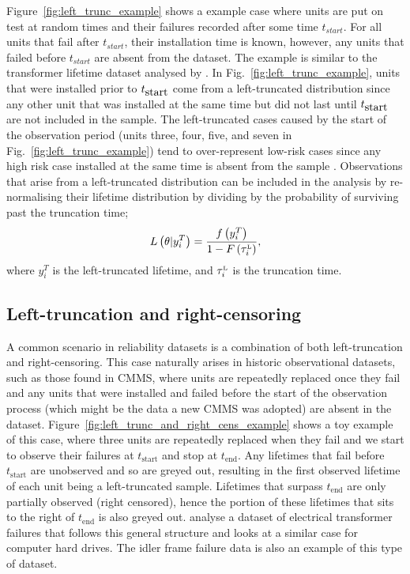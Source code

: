 Figure~\ref{fig:left_trunc_example} shows a example case where units are put on test at random times and their failures recorded after some time $t_{start}$. For all units that fail after $t_{start}$, their installation time is known, however, any units that failed before $t_{start}$ are absent from the dataset. The example is similar to the transformer lifetime dataset analysed by \citet{hong2009}. In Fig.~\ref{fig:left_trunc_example}, units that were installed prior to $t_{\hbox{start}}$ come from a left-truncated distribution since any other unit that was installed at the same time but did not last until $t_{\hbox{start}}$ are not included in the sample. The left-truncated cases caused by the start of the observation period (units three, four, five, and seven in Fig.~\ref{fig:left_trunc_example}) tend to over-represent low-risk cases since any high risk case installed at the same time is absent from the sample \citep{guo1993}. Observations that arise from a left-truncated distribution can be included in the analysis by re-normalising their lifetime distribution by dividing by the probability of surviving past the truncation time;
\begin{equation}
    \label{eq:left_trunc}
    L\left(\theta|y^T_i\right) = \frac{f\left(y^T_i\right)}{1 - F\left(\tau^{\hbox{\tiny{L}}}_i\right)},
\end{equation}
where $y^T_i$ is the left-truncated lifetime, and $\tau^{\hbox{\tiny{L}}}_i$ is the truncation time.

\subsection{Left-truncation and right-censoring} 

A common scenario in reliability datasets is a combination of both left-truncation and right-censoring. This case naturally arises in historic observational datasets, such as those found in CMMS, where units are repeatedly replaced once they fail and any units that were installed and failed before the start of the observation process (which might be the data a new CMMS was adopted) are absent in the dataset. Figure~\ref{fig:left_trunc_and_right_cens_example} shows a toy example of this case, where three units are repeatedly replaced when they fail and we start to observe their failures at $t_{\text{start}}$ and stop at $t_{\text{end}}$. Any lifetimes that fail before $t_{\text{start}}$ are unobserved and so are greyed out, resulting in the first observed lifetime of each unit being a left-truncated sample. Lifetimes that surpass $t_{\text{end}}$ are only partially observed (right censored), hence the portion of these lifetimes that sits to the right of $t_{\text{end}}$ is also greyed out. \citet{hong2009,mitra2013,kundu2016} analyse a dataset of electrical transformer failures that follows this general structure and \citet{mittman2013} looks at a similar case for computer hard drives. The idler frame failure data is also an example of this type of dataset.

